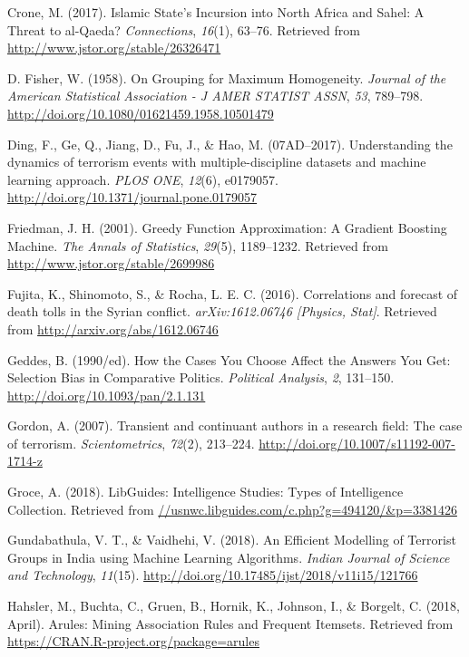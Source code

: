 \documentclass[11pt,oneside,a4paper]{reedthesis}
\begin{document}
\hypertarget{ref-Crone_2017}{}
Crone, M. (2017). Islamic State's Incursion into North Africa and Sahel:
A Threat to al-Qaeda? \emph{Connections}, \emph{16}(1), 63--76.
Retrieved from \url{http://www.jstor.org/stable/26326471}

\hypertarget{ref-D.Fisher_1958}{}
D. Fisher, W. (1958). On Grouping for Maximum Homogeneity. \emph{Journal
of the American Statistical Association - J AMER STATIST ASSN},
\emph{53}, 789--798. \url{http://doi.org/10.1080/01621459.1958.10501479}

\hypertarget{ref-Ding_2017}{}
Ding, F., Ge, Q., Jiang, D., Fu, J., \& Hao, M. (07AD--2017).
Understanding the dynamics of terrorism events with multiple-discipline
datasets and machine learning approach. \emph{PLOS ONE}, \emph{12}(6),
e0179057. \url{http://doi.org/10.1371/journal.pone.0179057}

\hypertarget{ref-Friedman_2001}{}
Friedman, J. H. (2001). Greedy Function Approximation: A Gradient
Boosting Machine. \emph{The Annals of Statistics}, \emph{29}(5),
1189--1232. Retrieved from \url{http://www.jstor.org/stable/2699986}

\hypertarget{ref-Fujita_2016}{}
Fujita, K., Shinomoto, S., \& Rocha, L. E. C. (2016). Correlations and
forecast of death tolls in the Syrian conflict. \emph{arXiv:1612.06746
{[}Physics, Stat{]}}. Retrieved from
\url{http://arxiv.org/abs/1612.06746}

\hypertarget{ref-Geddes_1990}{}
Geddes, B. (1990/ed). How the Cases You Choose Affect the Answers You
Get: Selection Bias in Comparative Politics. \emph{Political Analysis},
\emph{2}, 131--150. \url{http://doi.org/10.1093/pan/2.1.131}

\hypertarget{ref-Gordon_2007}{}
Gordon, A. (2007). Transient and continuant authors in a research field:
The case of terrorism. \emph{Scientometrics}, \emph{72}(2), 213--224.
\url{http://doi.org/10.1007/s11192-007-1714-z}

\hypertarget{ref-Groce_2018}{}
Groce, A. (2018). LibGuides: Intelligence Studies: Types of Intelligence
Collection. Retrieved from
\url{//usnwc.libguides.com/c.php?g=494120/\&p=3381426}

\hypertarget{ref-Gundabathula_2018}{}
Gundabathula, V. T., \& Vaidhehi, V. (2018). An Efficient Modelling of
Terrorist Groups in India using Machine Learning Algorithms.
\emph{Indian Journal of Science and Technology}, \emph{11}(15).
\url{http://doi.org/10.17485/ijst/2018/v11i15/121766}

\hypertarget{ref-Hahsler_2018}{}
Hahsler, M., Buchta, C., Gruen, B., Hornik, K., Johnson, I., \& Borgelt,
C. (2018, April). Arules: Mining Association Rules and Frequent
Itemsets. Retrieved from \url{https://CRAN.R-project.org/package=arules}
\end{document}
